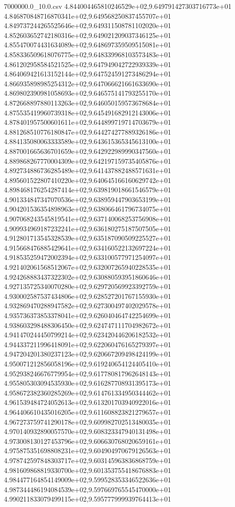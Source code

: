 \begin{filecontents*}{7000000.0_10.0.csv}
4.844004465810246529e+02,9.649791427303716773e+01
4.846870848716870341e+02,9.649568250837455707e+01
4.849737244265525646e+02,9.649311508781102020e+01
4.852603652742180316e+02,9.649021209037346125e+01
4.855470074431634089e+02,9.648697359509515081e+01
4.858336509618076775e+02,9.648339968103573483e+01
4.861202958584521525e+02,9.647949042722939339e+01
4.864069421613152144e+02,9.647524591273486294e+01
4.866935898985254312e+02,9.647066621661633690e+01
4.869802390981058693e+02,9.646575141793255170e+01
4.872668897880113263e+02,9.646050159573678684e+01
4.875535419960739318e+02,9.645491682912143006e+01
4.878401957500601611e+02,9.644899719714703679e+01
4.881268510776180847e+02,9.644274277889326186e+01
4.884135080063333589e+02,9.643615365345613100e+01
4.887001665636701659e+02,9.642922989990347560e+01
4.889868267770004309e+02,9.642197159735405876e+01
4.892734886736285489e+02,9.641437882488571631e+01
4.895601522807410220e+02,9.640645166160629742e+01
4.898468176254287414e+02,9.639819018661546579e+01
4.901334847347070536e+02,9.638959447903653199e+01
4.904201536354898963e+02,9.638066461796734075e+01
4.907068243545819541e+02,9.637140068253756908e+01
4.909934969187232241e+02,9.636180275187507505e+01
4.912801713545328539e+02,9.635187090509225527e+01
4.915668476885429641e+02,9.634160522132697224e+01
4.918535259472002394e+02,9.633100577971254097e+01
4.921402061568512067e+02,9.632007265940228535e+01
4.924268883437322302e+02,9.630880593951860646e+01
4.927135725340070280e+02,9.629720569923392759e+01
4.930002587537434806e+02,9.628527201767155930e+01
4.932869470288947582e+02,9.627300497402029578e+01
4.935736373853378041e+02,9.626040464742254699e+01
4.938603298488306450e+02,9.624747111704982672e+01
4.941470244450799214e+02,9.623420446206182532e+01
4.944337211996418091e+02,9.622060476165279397e+01
4.947204201380237123e+02,9.620667209498424199e+01
4.950071212856058196e+02,9.619240654124405410e+01
4.952938246676779954e+02,9.617780817962648143e+01
4.955805303094535930e+02,9.616287708931395173e+01
4.958672382360285269e+02,9.614761334950344462e+01
4.961539484724052613e+02,9.613201703940922016e+01
4.964406610435016205e+02,9.611608823821279657e+01
4.967273759741290178e+02,9.609982702513480035e+01
4.970140932890057570e+02,9.608323347940131498e+01
4.973008130127453796e+02,9.606630768020659161e+01
4.975875351698808231e+02,9.604904970679126563e+01
4.978742597848303717e+02,9.603145963836868759e+01
4.981609868819330700e+02,9.601353755418676883e+01
4.984477164854149009e+02,9.599528353346522636e+01
4.987344486194084539e+02,9.597669765545470000e+01
4.990211833079499115e+02,9.595777999939764413e+01

\end{filecontents*}
